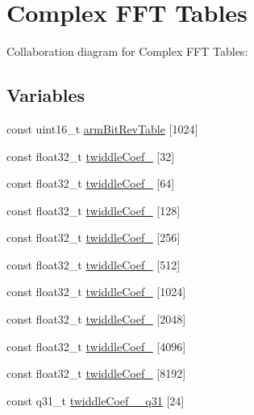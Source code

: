 \hypertarget{group__CFFT__CIFFT}{}\section{Complex F\+FT Tables}
\label{group__CFFT__CIFFT}
Collaboration diagram for Complex F\+FT Tables\+:
\subsection*{Variables}
\begin{DoxyCompactItemize}
\item 
const uint16\+\_\+t \hyperlink{group__CFFT__CIFFT_gae247e83ad50d474107254e25b36ad42b}{arm\+Bit\+Rev\+Table} \mbox{[}1024\mbox{]}
\item 
const float32\+\_\+t \hyperlink{group__CFFT__CIFFT_gae75e243ec61706427314270f222e0c8e}{twiddle\+Coef\+\_} \mbox{[}32\mbox{]}
\item 
const float32\+\_\+t \hyperlink{group__CFFT__CIFFT_ga78a72c85d88185de98050c930cfc76e3}{twiddle\+Coef\+\_} \mbox{[}64\mbox{]}
\item 
const float32\+\_\+t \hyperlink{group__CFFT__CIFFT_ga4f3c6d98c7e66393b4ef3ac63746e43d}{twiddle\+Coef\+\_} \mbox{[}128\mbox{]}
\item 
const float32\+\_\+t \hyperlink{group__CFFT__CIFFT_ga948433536dafaac1381decfccf4e2d9c}{twiddle\+Coef\+\_} \mbox{[}256\mbox{]}
\item 
const float32\+\_\+t \hyperlink{group__CFFT__CIFFT_gafe813758a03a798e972359a092315be4}{twiddle\+Coef\+\_} \mbox{[}512\mbox{]}
\item 
const float32\+\_\+t \hyperlink{group__CFFT__CIFFT_gad8830f0c068ab2cc19f2f87d220fa148}{twiddle\+Coef\+\_} \mbox{[}1024\mbox{]}
\item 
const float32\+\_\+t \hyperlink{group__CFFT__CIFFT_ga27c056eb130a4333d1cc5dd43ec738b1}{twiddle\+Coef\+\_} \mbox{[}2048\mbox{]}
\item 
const float32\+\_\+t \hyperlink{group__CFFT__CIFFT_ga23e7f30421a7905b21c2015429779633}{twiddle\+Coef\+\_} \mbox{[}4096\mbox{]}
\item 
const float32\+\_\+t \hyperlink{group__CFFT__CIFFT_gae0182d1dd3b2f21aad4e38a815a0bd40}{twiddle\+Coef\+\_} \mbox{[}8192\mbox{]}
\item 
const q31\+\_\+t \hyperlink{group__CFFT__CIFFT_gaef4697e1ba348c4ac9358f2b9e279e93}{twiddle\+Coef\+\_\+\_\+q31} \mbox{[}24\mbox{]}
\item 

\end{DoxyCompactItemize}
